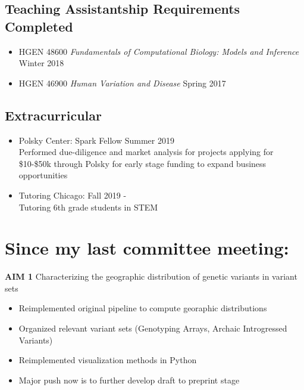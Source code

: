 \documentclass[a4paper, 11pt]{article}
\begin{document}
\subsection*{Teaching Assistantship Requirements Completed}
\begin{itemize}
	\item HGEN 48600 \emph{Fundamentals of Computational Biology: Models and Inference} \hfill Winter 2018\\
	\item HGEN 46900 \emph{Human Variation and Disease} \hfill Spring 2017\\
\end{itemize}

\subsection*{Extracurricular}
\begin{itemize}
	\item  Polsky Center: Spark Fellow \hfill Summer 2019 \\
		Performed due-diligence and market analysis for projects applying for \$10-\$50k through Polsky for early stage funding to expand business opportunities  
	\item  Tutoring Chicago:  \hfill Fall 2019 -  \\
		Tutoring 6th grade students in STEM 	
\end{itemize}

\newpage

\section*{Since my last committee meeting:}

 \textbf{AIM 1} Characterizing the geographic distribution of genetic variants in variant sets \\
 \begin{itemize}
  \item Reimplemented original pipeline to compute georaphic distributions  
  \item Organized relevant variant sets (Genotyping Arrays, Archaic Introgressed Variants)   
  \item Reimplemented visualization methods in Python
  \item Major push now is to further develop draft to preprint stage 
 \end{itemize}
\end{document}
